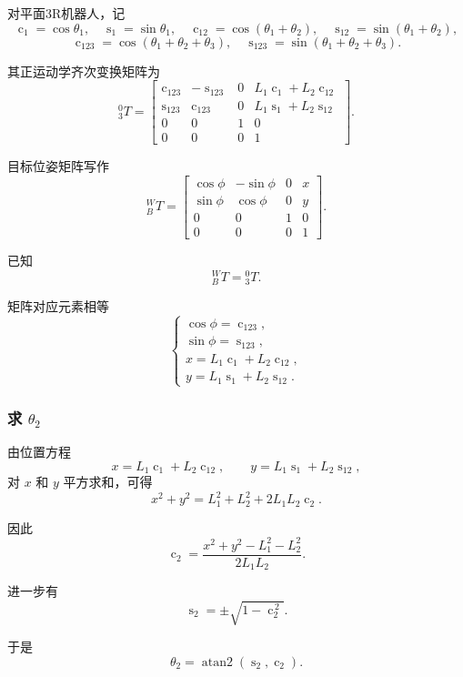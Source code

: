 对平面3R机器人，记
\[
\operatorname{c}_{1}=\cos\theta_1,\quad \operatorname{s}_{1}=\sin\theta_1,\quad
\operatorname{c}_{12}=\cos(\theta_1+\theta_2),\quad \operatorname{s}_{12}=\sin(\theta_1+\theta_2),
\]
\[
\operatorname{c}_{123}=\cos(\theta_1+\theta_2+\theta_3),\quad
\operatorname{s}_{123}=\sin(\theta_1+\theta_2+\theta_3).
\]

其正运动学齐次变换矩阵为
$$
{}^{0}_{3}T=
\begin{bmatrix}
\operatorname{c}_{123} & -\operatorname{s}_{123} & 0 & L_1\operatorname{c}_{1}+L_2\operatorname{c}_{12}\\
\operatorname{s}_{123} &  \operatorname{c}_{123} & 0 & L_1\operatorname{s}_{1}+L_2\operatorname{s}_{12}\\
0 & 0 & 1 & 0\\
0 & 0 & 0 & 1
\end{bmatrix}.
$$

目标位姿矩阵写作
$$
{}^{W}_{B}T=
\begin{bmatrix}
\cos\phi & -\sin\phi & 0 & x\\
\sin\phi &  \cos\phi & 0 & y\\
0 & 0 & 1 & 0\\
0 & 0 & 0 & 1
\end{bmatrix}.
$$

已知
$$
{}^{W}_{B}T={}^0_3T.
$$

矩阵对应元素相等
$$
\begin{cases}
\cos\phi=\operatorname{c}_{123},\\
\sin\phi=\operatorname{s}_{123},\\
x=L_1\operatorname{c}_{1}+L_2\operatorname{c}_{12},\\
y=L_1\operatorname{s}_{1}+L_2\operatorname{s}_{12}.
\end{cases}
$$

\subsubsection{求 $\theta_2$}

由位置方程
\[
x=L_1\operatorname{c}_{1}+L_2\operatorname{c}_{12},\qquad
 y=L_1\operatorname{s}_{1}+L_2\operatorname{s}_{12},
\]
对 $x$ 和 $y$ 平方求和，可得
$$
x^2+y^2=L_1^2+L_2^2+2L_1L_2\operatorname{c}_{2}.
$$

因此
$$
\operatorname{c}_{2}=\frac{x^2+y^2-L_1^2-L_2^2}{2L_1L_2}.
$$

进一步有
$$
\operatorname{s}_{2}=\pm\sqrt{1-\operatorname{c}_{2}^{\,2}}.
$$

于是
$$
\theta_2=\operatorname{atan2}(\operatorname{s}_{2},\operatorname{c}_{2}).
$$


